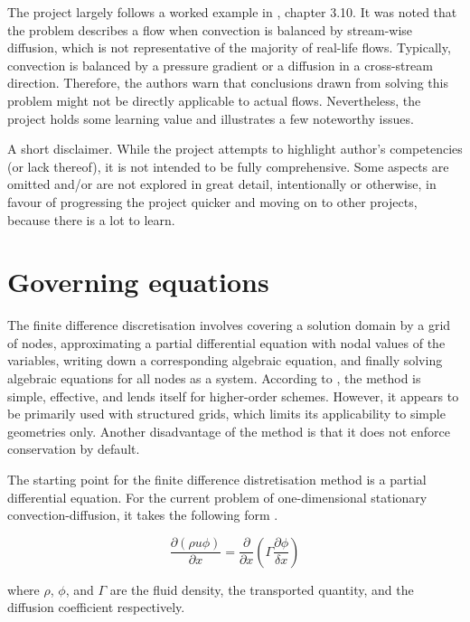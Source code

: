\documentclass[12pt]{article}
\begin{document}
The project largely follows a worked example in \textcite{FerzigerCFD}, chapter 3.10. It was noted that the problem describes a flow when convection is balanced by stream-wise diffusion, which is not representative of the majority of real-life flows. Typically, convection is balanced by a pressure gradient or a diffusion in a cross-stream direction. Therefore, the authors warn that conclusions drawn from solving this problem might not be directly applicable to actual flows. Nevertheless, the project holds some learning value and illustrates a few noteworthy issues.

A short disclaimer. While the project attempts to highlight author's competencies (or lack thereof), it is not intended to be fully comprehensive. Some aspects are omitted and/or are not explored in great detail, intentionally or otherwise, in favour of progressing the project quicker and moving on to other projects, because there is a lot to learn.


\section{Governing equations}
\label{sec:govEq}

The finite difference discretisation involves covering a solution domain by a grid of nodes, approximating a partial differential equation with nodal values of the variables, writing down a corresponding algebraic equation, and finally solving algebraic equations for all nodes as a system. According to \textcite{FerzigerCFD}, the method is simple, effective, and lends itself for higher-order schemes. However, it appears to be primarily used with structured grids, which limits its applicability to simple geometries only. Another disadvantage of the method is that it does not enforce conservation by default.

The starting point for the finite difference distretisation method is a partial differential equation. For the current problem of one-dimensional stationary convection-diffusion, it takes the following form \parencite{FerzigerCFD}.

\begin{equation}
    \frac{\partial (\rho u \phi)}{\partial x} = \frac{\partial}{\partial x} \left( \Gamma \frac{\partial \phi}{\delta x} \right)
\end{equation}

\noindent where $\rho$, $\phi$, and $\Gamma$ are the fluid density, the transported quantity, and the diffusion coefficient respectively.
\end{document}
